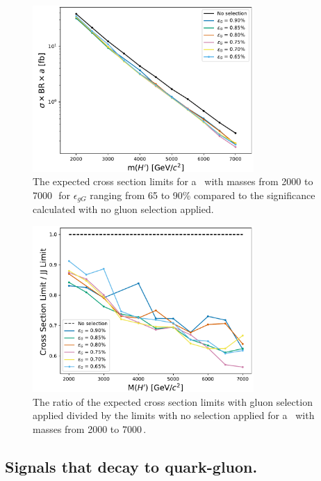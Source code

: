 \begin{figure}[htb]
 \centering
\includegraphics[width=0.75\textwidth]{figures/significance/Limits_GG_All.pdf}
\caption{ The expected cross section limits for a \Hprime\ with masses from 2000 to 7000\,\GeV\ 
for $\epsilon_{gG}$ ranging from 65 to 90\% compared to the significance calculated with 
   no gluon selection applied.
  \label{fig:GluonSignalSignificancePD}}
\end{figure}

\begin{figure}[htb]
 \centering
\includegraphics[width=0.75\textwidth]{figures/significance/Ratio_GG_All.pdf}
\caption{ The ratio of the expected cross section limits with gluon selection applied divided by the limits with no selection applied for a \Hprime\ with masses from 2000 to 7000\,\GeV. \label{fig:GluonSignalSignificanceRatio}}
\end{figure}


\subsection{Signals that decay to quark-gluon.}

